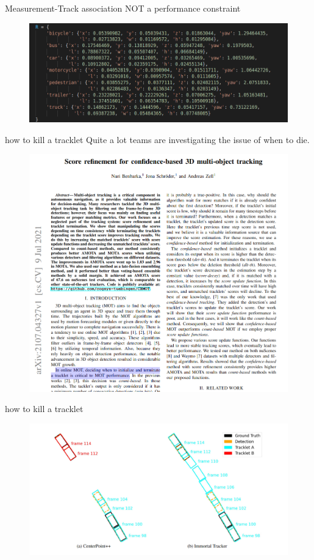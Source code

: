 \documentclass[aspectratio=169,xcolor=dvipsnames]{beamer}
\begin{document}
\begin{frame}{Measurement-Track association NOT a performance constraint}
    \begin{figure}
    \includegraphics[width=0.9\linewidth]{DA/4.png}
    \end{figure}
\end{frame}

\begin{frame}{how to kill a tracklet}
    Quite a lot teams are investigating the issue of when to die.
    \begin{figure}
    \includegraphics[width=0.4\linewidth]{termination/1.png}
    \end{figure}
\end{frame}

\begin{frame}{how to kill a tracklet}
    
    \begin{figure}
    \includegraphics[width=0.9\linewidth]{termination/2.png}
    \end{figure}
\end{frame}
\end{document}
